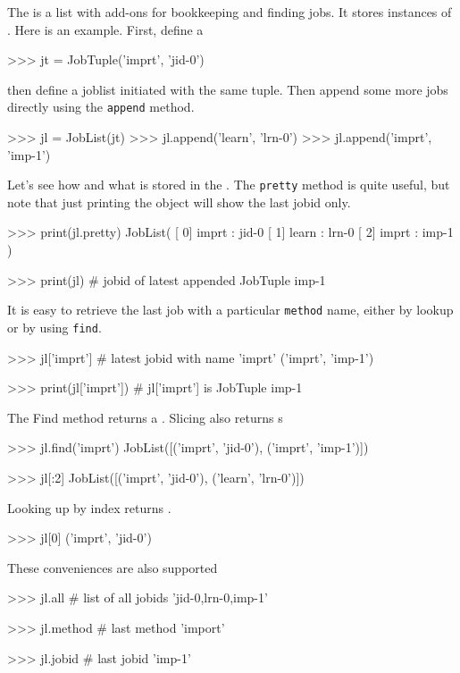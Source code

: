 \label{sec:joblist}
The \joblist is a list with add-ons for bookkeeping and finding jobs.
It stores instances of \jobtuple.  Here is an example.  First, define
a \jobtuple

\begin{python}
>>> jt = JobTuple('imprt', 'jid-0')
\end{python}
then define a joblist initiated with the same tuple.  Then append some
more jobs directly using the \texttt{append} method.

\begin{python}
>>> jl = JobList(jt)
>>> jl.append('learn', 'lrn-0')
>>> jl.append('imprt', 'imp-1')
\end{python}
Let's see how and what is stored in the \joblist.  The \texttt{pretty}
method is quite useful, but note that just printing the object will
show the last jobid only.

\begin{python}
>>> print(jl.pretty)
JobList(
   [  0]  imprt : jid-0
   [  1]  learn : lrn-0
   [  2]  imprt : imp-1
)

>>>  print(jl)  # jobid of latest appended JobTuple
imp-1
\end{python}

It is easy to retrieve the last job with a particular \texttt{method}
name, either by lookup or by using \texttt{find}.

\begin{python}
>>> jl['imprt']         # latest jobid with name 'imprt'
('imprt', 'imp-1')

>>> print(jl['imprt'])   # jl['imprt'] is JobTuple
imp-1
\end{python}
The Find method returns a \joblist.  Slicing also returns {\joblist}s

\begin{python}
>>> jl.find('imprt')
JobList([('imprt', 'jid-0'), ('imprt', 'imp-1')])

>>> jl[:2]
JobList([('imprt', 'jid-0'), ('learn', 'lrn-0')])
\end{python}
Looking up by index returns \jobtuple.

\begin{python}
>>> jl[0]
('imprt', 'jid-0')
\end{python}
These conveniences are also supported

\begin{python}
>>> jl.all              # list of all jobids
'jid-0,lrn-0,imp-1'

>>> jl.method           # last method
'import'

>>> jl.jobid            # last jobid
'imp-1'
\end{python}



